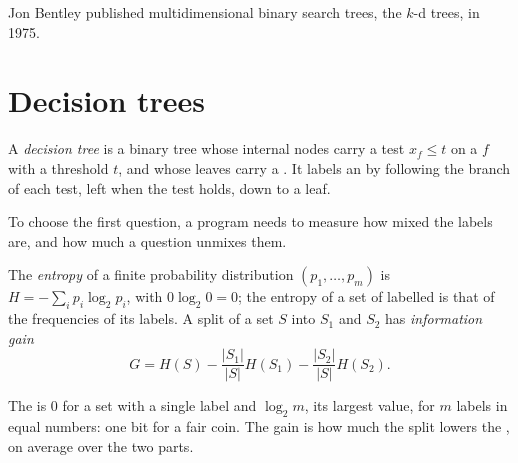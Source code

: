 \begin{history}
Jon Bentley published multidimensional binary search trees, the $k$-d trees, in 1975.
\end{history}

\section{Decision trees}\label{sec:b2:trees-and-clustering:trees}

\begin{definition}\label{def:b2:trees-and-clustering:decision-tree}
A \emph{decision tree} is a binary tree whose internal nodes carry a test $x_f \leq t$ on a 
$f$ with a threshold $t$, and whose leaves carry a . It labels an  by following the branch of each
test, left when the test holds, down to a leaf.
\end{definition}

To choose the first question, a program needs to measure how mixed the labels are, and how much a question unmixes
them.

\begin{definition}\label{def:b2:trees-and-clustering:entropy}
The \emph{entropy} of a finite probability distribution $(p_1, \dots, p_m)$ is $H = -\sum_i p_i \log_2
p_i$, with $0 \log_2 0 = 0$; the entropy of a set of labelled  is that of the frequencies of its labels. A split
of a set $S$ into $S_1$ and $S_2$ has \emph{information gain}
\[
G = H(S) - \frac{|S_1|}{|S|} H(S_1) - \frac{|S_2|}{|S|} H(S_2).
\]
\end{definition}

The  is $0$ for a set with a single label and $\log_2 m$, its largest value, for $m$ labels in equal numbers: one
bit for a fair coin. The gain is how much the split lowers the , on average over the two parts.

